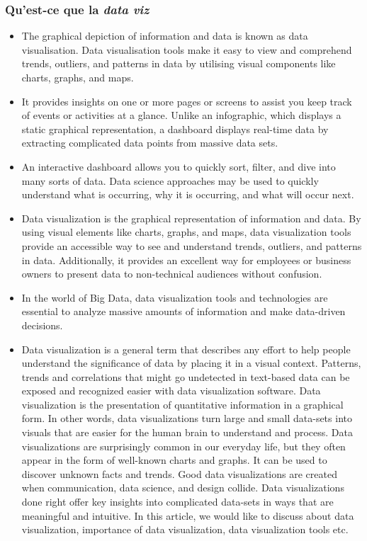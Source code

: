 \begin{frame}\frametitle{Qu'est-ce que la \textit{data viz}}
   \begin{itemize}
      \item The graphical depiction of information and data is known as data visualisation. Data visualisation tools make it easy to view and comprehend trends, outliers, and patterns in data by utilising visual components like charts, graphs, and maps.
      \item It provides insights on one or more pages or screens to assist you keep track of events or activities at a glance. Unlike an infographic, which displays a static graphical representation, a dashboard displays real-time data by extracting complicated data points from massive data sets. 
      \item An interactive dashboard allows you to quickly sort, filter, and dive into many sorts of data. Data science approaches may be used to quickly understand what is occurring, why it is occurring, and what will occur next.
      \item Data visualization is the graphical representation of information and data. By using visual elements like charts, graphs, and maps, data visualization tools provide an accessible way to see and understand trends, outliers, and patterns in data. Additionally, it provides an excellent way for employees or business owners to present data to non-technical audiences without confusion.
      \item In the world of Big Data, data visualization tools and technologies are essential to analyze massive amounts of information and make data-driven decisions.
      \item Data visualization is a general term that describes any effort to help people understand the significance of data by placing it in a visual context. Patterns, trends and correlations that might go undetected in text-based data can be exposed and recognized easier with data visualization software. Data visualization is the presentation of quantitative information in a graphical form. In other words, data visualizations turn large and small data-sets into visuals that are easier for the human brain to understand and process. Data visualizations are surprisingly common in our everyday life, but they often appear in the form of well-known charts and graphs. It can be used to discover unknown facts and trends. Good data visualizations are created when communication, data science, and design collide. Data visualizations done right offer key insights into complicated data-sets in ways that are meaningful and intuitive. In this article, we would like to discuss about data visualization, importance of data visualization, data visualization tools etc.
   \end{itemize}
\end{frame}

